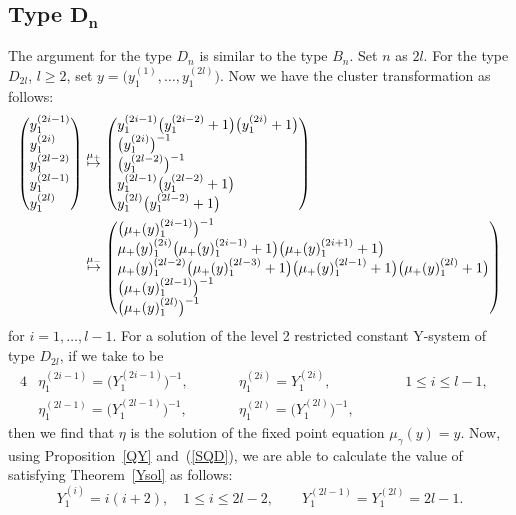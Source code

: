 \documentclass[pdftex]{sigma}
\numberwithin{equation}{section}
\begin{document}
	\subsection[Type D\_n]{Type $\boldsymbol{D_n}$}
The argument for the type $D_n$ is similar to the type $B_n$.
Set $n$ as $2l$.
For the type $D_{2l}$, $l\geq2$, set $y=\bigl(y_1^{(1)},\dots,y_1^{(2l)}\bigr)$.
Now we have the cluster transformation as follows:
		\begin{align*}
		\left( \begin{array}{@{}l@{}}
			y_1^{(2i-1)}\\
			y_1^{(2i)}\\
			y_1^{(2l-2)}\\
			y_1^{(2l-1)}\\
			y_1^{(2l)}
		\end{array} \right)&\overset{\mu_+}{\mapsto}
		\left( \begin{array}{@{}l@{}}
			y_1^{(2i-1)}\bigl(y_1^{(2i-2)}+1\bigr)\bigl(y_1^{(2i)}+1\bigr)\\
			\bigl(y_1^{(2i)}\bigr)^{-1}\\
			\bigl(y_1^{(2l-2)}\bigr)^{-1}\\
			y_1^{(2l-1)}\bigl(y_1^{(2l-2)}+1\bigr)\\
			y_1^{(2l)}\bigl(y_1^{(2l-2)}+1\bigr)
		\end{array} \right)\\
		&\overset{\mu_-}{\mapsto}
		\left( \begin{array}{@{}l@{}}
			\bigl(\mu_+(y)_1^{(2i-1)}\bigr)^{-1}\\
			\mu_+(y)_1^{(2i)}\bigl(\mu_+(y)_1^{(2i-1)}+1\bigr)\bigl(\mu_+(y)_1^{(2i+1)}+1\bigr)\\
			\mu_+(y)_1^{(2l-2)}\bigl(\mu_+(y)_1^{(2l-3)}+1\bigr)\bigl(\mu_+(y)_1^{(2l-1)}+1\bigr)\bigl(\mu_+(y)_1^{(2l)}+1\bigr)\\
			\bigl(\mu_+(y)_1^{(2l-1)}\bigr)^{-1}\\
			\bigl(\mu_+(y)_1^{(2l)}\bigr)^{-1}
		\end{array} \right)
		\end{align*}
for $i=1,\dots,l-1$.
For a solution of the level 2 restricted constant Y-system of type $D_{2l}$, if we take  to be
	\begin{alignat*}{4}
 &\eta_1^{(2i-1)}=\bigl(Y_1^{(2i-1)}\bigr)^{-1},\qquad&& \eta_1^{(2i)}=Y_1^{(2i)},\qquad&& 1\leq i\leq l-1, & \\ &\eta_1^{(2l-1)}=\bigl(Y_1^{(2l-1)}\bigr)^{-1},\qquad&&\eta_1^{(2l)}=\bigl(Y_1^{(2l)}\bigr)^{-1},\qquad&& &
 \end{alignat*}
then we find that $\eta$ is the solution of the fixed point equation $\mu_\gamma(y)=y$.
Now, using Proposition~\ref{QY} and~(\ref{SQD}), we are able to calculate the value of  satisfying Theorem~\ref{Ysol} as follows:
	\[Y_1^{(i)}=i(i+2),\quad 1\leq i\leq 2l-2,\qquad Y_1^{(2l-1)}=Y_1^{(2l)}=2l-1.\]
\end{document}
